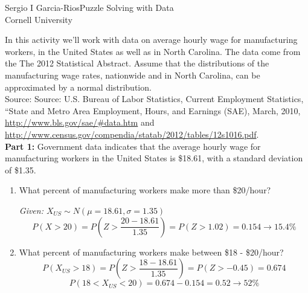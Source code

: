 \documentclass[12pt]{article}
\newcommand{\appno}[1]
{}
\newcommand{\soln}[2]{\textit{\textcolor{custom_red}{#2}}}{}
\begin{document}

Sergio I Garcia-Rios\hfill Puzzle Solving with Data \\
Cornell University \hfill \\

\ttl{Prelim 1 \appno{}: \\
}


In this activity we'll work with data on average hourly wage for manufacturing workers, in the United States as well as in 
North Carolina. The data come from the The 2012 Statistical Abstract. Assume that the distributions of the manufacturing 
wage rates, nationwide and in North Carolina, can be approximated by a normal distribution. \\

{\footnotesize Source: Source: U.S. Bureau of Labor Statistics, Current Employment Statistics, ``State and Metro Area 
Employment, Hours, and Earnings (SAE), March, 2010, \url{http://www.bls.gov/sae/\#data.htm} and \url{http://www.census.gov/compendia/statab/2012/tables/12s1016.pdf}.} \\

\textbf{Part 1:}
Government data indicates that the average hourly wage for manufacturing workers in the United States is \$18.61, 
with a standard deviation of \$1.35. 
\begin{enumerate}

\item What percent of manufacturing workers make more than \$20/hour?

\soln{3.5cm}{
Given: $X_{US} \sim N(\mu = 18.61, \sigma = 1.35)$
\[ P(X > 20) = P\left( Z > \frac{20 - 18.61}{1.35} \right) = P(Z > 1.02) = 0.154 \rightarrow 15.4\% \]
}

\item What percent of manufacturing workers make between \$18 - \$20/hour? \\

\soln{3.5cm}{
\[ P(X_{US} > 18) = P\left( Z > \frac{18 - 18.61}{1.35} \right) = P(Z > -0.45) = 0.674 \]
\[ P(18 < X_{US} < 20) = 0.674 - 0.154 = 0.52 \rightarrow 52\% \]
}

\end{enumerate}
\end{document}
